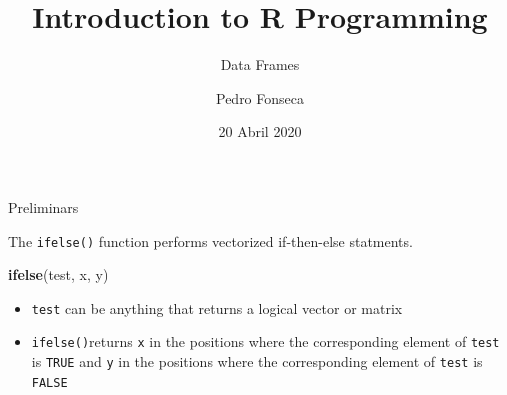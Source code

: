 \documentclass[ignorenonframetext,]{beamer}
\title{Introduction to R Programming}
\subtitle{Data Frames}
\author{Pedro Fonseca}
\date{20 Abril 2020}
\newenvironment{Shaded}{\begin{snugshade}}{\end{snugshade}}
\newcommand{\KeywordTok}[1]{\textcolor[rgb]{0.13,0.29,0.53}{\textbf{#1}}}
\newcommand{\NormalTok}[1]{#1}
\begin{document}
\frame{\titlepage}

\begin{frame}[fragile]{Preliminars}
\protect\hypertarget{preliminars}{}

The \texttt{ifelse()} function performs vectorized if-then-else
statments.

\begin{Shaded}
\begin{Highlighting}[]
\KeywordTok{ifelse}\NormalTok{(test, x, y)}
\end{Highlighting}
\end{Shaded}

\begin{itemize}
\item
  \texttt{test} can be anything that returns a logical vector or matrix
\item
  \texttt{ifelse()}returns \texttt{x} in the positions where the
  corresponding element of \texttt{test} is \texttt{TRUE} and \texttt{y}
  in the positions where the corresponding element of \texttt{test} is
  \texttt{FALSE}
\end{itemize}

\end{frame}
\end{document}
